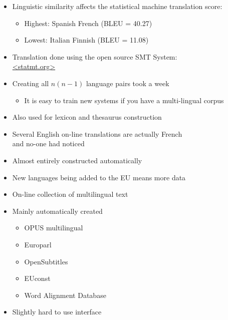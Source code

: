 \documentclass[a4paper,landscape,headrule,footrule,xetex]{foils}
\begin{document}
  \MyLogo{}
\begin{center}
\end{center}


\begin{itemize}
\item Linguistic similarity affects the statistical machine translation score:
  \begin{itemize}
  \item Highest: Spanish \into French (BLEU = 40.27)
  \item Lowest: Italian \into Finnish  (BLEU = 11.08)
  \end{itemize}

\item Translation done using the open source SMT System:
 \\  \url{<statmt.org>}

\item Creating all $n(n-1)$ language pairs took a week
  \begin{itemize}
  \item It is easy to train new systems if you have a multi-lingual corpus
  \end{itemize}
\end{itemize}


\begin{itemize}
\item Also used for lexicon and thesaurus construction
\item Several English on-line translations are actually French
  \\ and no-one had noticed 
\item Almost entirely constructed automatically
\item New languages being added to the EU means more data
\end{itemize}



\begin{itemize}
\item On-line collection of multilingual text
\item Mainly automatically created
  \begin{itemize}
  \item  OPUS multilingual 
  \item Europarl 
  \item OpenSubtitles 
  \item EUconst 
  \item Word Alignment Database
  \end{itemize}
\item Slightly hard to use interface
\end{itemize}
\end{document}
